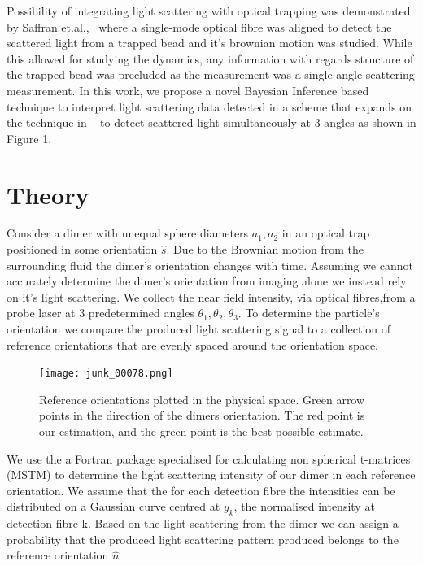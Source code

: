 \documentclass[11pt]{article}
\begin{document}
Possibility of integrating light scattering with optical trapping was demonstrated by Saffran et.al.,~\cite{Saffran} where a single-mode optical fibre was aligned to detect the scattered light from a trapped bead and it's brownian motion was studied. While this allowed for studying the dynamics, any information with regards structure of the trapped bead was precluded as the measurement was a single-angle scattering measurement.
In this work, we propose a novel Bayesian Inference based technique to interpret light scattering data detected in a scheme that expands on the technique in ~\cite{Saffran} to detect scattered light simultaneously at 3 angles as shown in Figure 1.  
	
	\section*{Theory}
	
	Consider a dimer with unequal sphere diameters $a_1, a_2$ in an optical trap positioned in some orientation $\hat{s}$. Due to the Brownian motion from the surrounding fluid the dimer's orientation changes with time. Assuming we cannot accurately determine the dimer's orientation from imaging alone we instead rely on it's light scattering. We collect the near field intensity, via optical fibres,from a probe laser at 3 predetermined angles $\theta_1, \theta_2, \theta_3$. To determine the particle's orientation we compare the produced light scattering signal to a collection of reference orientations that are evenly spaced around the orientation space.
	   
	\begin{figure}[t]
		\centering
		\texttt{[image: junk\_00078.png]}
		\caption{Reference orientations plotted in the physical space. Green arrow points in the direction of the dimers orientation. The red point is our estimation, and the green point is the best possible estimate.}
	\end{figure}
	
	We use the a Fortran package specialised for calculating non spherical t-matrices (MSTM) \cite{MSTM} to determine the light scattering intensity of our dimer in each reference orientation. We assume that the for each detection fibre the intensities can be distributed on a Gaussian curve centred at $y_k$, the normalised intensity at detection fibre k. Based on the light scattering from the dimer we can assign a probability that the produced light scattering pattern produced belongs to the reference orientation $\hat{n}$
	
\end{document}
